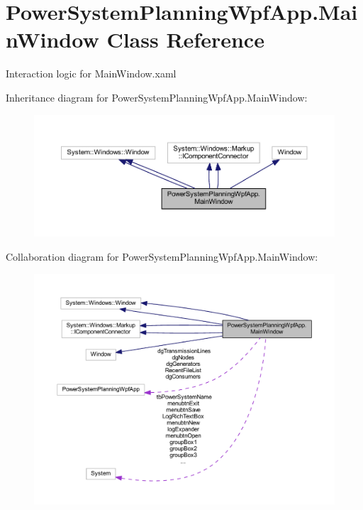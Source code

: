 \hypertarget{class_power_system_planning_wpf_app_1_1_main_window}{}\section{Power\+System\+Planning\+Wpf\+App.\+Main\+Window Class Reference}
\label{class_power_system_planning_wpf_app_1_1_main_window}


Interaction logic for Main\+Window.\+xaml  




Inheritance diagram for Power\+System\+Planning\+Wpf\+App.\+Main\+Window\+:\nopagebreak
\begin{figure}[H]
\begin{center}
\leavevmode
\includegraphics[width=350pt]{class_power_system_planning_wpf_app_1_1_main_window__inherit__graph}
\end{center}
\end{figure}


Collaboration diagram for Power\+System\+Planning\+Wpf\+App.\+Main\+Window\+:
\nopagebreak
\begin{figure}[H]
\begin{center}
\leavevmode
\includegraphics[width=350pt]{class_power_system_planning_wpf_app_1_1_main_window__coll__graph}
\end{center}
\end{figure}
